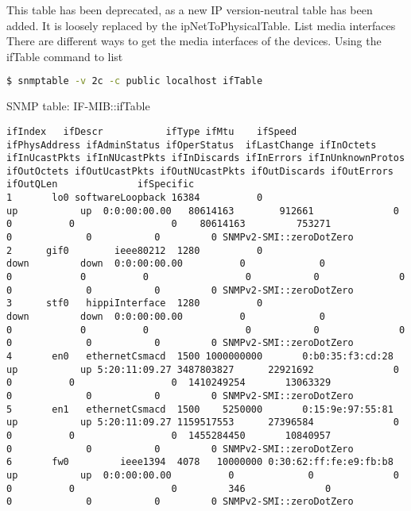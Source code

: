 This table has been deprecated, as a new IP version-neutral table has been added. It is loosely replaced by the ipNetToPhysicalTable.
List media interfaces
There are different ways to get the media interfaces of the devices.
Using the ifTable command to list

\begin{lstlisting}[language=bash]
$ snmptable -v 2c -c public localhost ifTable
\end{lstlisting}

SNMP table: IF-MIB::ifTable

\begin{lstlisting}
ifIndex   ifDescr           ifType ifMtu    ifSpeed          ifPhysAddress ifAdminStatus ifOperStatus  ifLastChange ifInOctets ifInUcastPkts ifInNUcastPkts ifInDiscards ifInErrors ifInUnknownProtos ifOutOctets ifOutUcastPkts ifOutNUcastPkts ifOutDiscards ifOutErrors ifOutQLen              ifSpecific
1       lo0 softwareLoopback 16384          0                                   up           up  0:0:00:00.00   80614163        912661              0            0          0                 0    80614163         753271               0             0           0         0 SNMPv2-SMI::zeroDotZero
2      gif0        ieee80212  1280          0                                 down         down  0:0:00:00.00          0             0              0            0          0                 0           0              0               0             0           0         0 SNMPv2-SMI::zeroDotZero
3      stf0   hippiInterface  1280          0                                 down         down  0:0:00:00.00          0             0              0            0          0                 0           0              0               0             0           0         0 SNMPv2-SMI::zeroDotZero
4       en0   ethernetCsmacd  1500 1000000000       0:b0:35:f3:cd:28            up           up 5:20:11:09.27 3487803827      22921692              0            0          0                 0  1410249254       13063329               0             0           0         0 SNMPv2-SMI::zeroDotZero
5       en1   ethernetCsmacd  1500    5250000       0:15:9e:97:55:81            up           up 5:20:11:09.27 1159517553      27396584              0            0          0                 0  1455284450       10840957               0             0           0         0 SNMPv2-SMI::zeroDotZero
6       fw0         ieee1394  4078   10000000 0:30:62:ff:fe:e9:fb:b8            up           up  0:0:00:00.00          0             0              0            0          0                 0         346              0               0             0           0         0 SNMPv2-SMI::zeroDotZero

\end{lstlisting}
